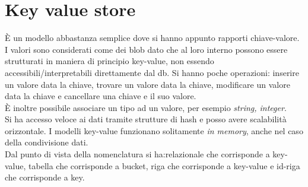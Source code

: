 \section{Key value store}
È un modello abbastanza semplice dove si hanno appunto rapporti chiave-valore. I valori sono considerati come dei blob dato che al loro interno possono essere strutturati in maniera di principio key-value, non essendo accessibili/interpretabili direttamente dal db. Si hanno poche operazioni: inserire un valore data la chiave, trovare un valore data la chiave, modificare un valore data la chiave e cancellare una chiave e il suo valore.\\
È inoltre possibile associare un tipo ad un valore, per esempio \textit{string, integer}.\\ 
Si ha accesso veloce ai dati tramite strutture di hash e posso avere scalabilità orizzontale. I modelli key-value funzionano solitamente \textit{in memory}, anche nel caso della condivisione dati.\\
Dal punto di vista della nomenclatura si ha:relazionale che corrisponde a key-value, tabella che corrisponde a bucket, riga che corrisponde a key-value e id-riga che corrisponde a key.

